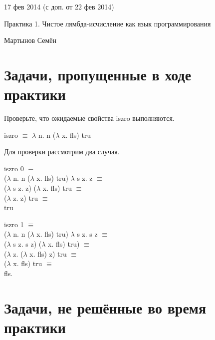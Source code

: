 \documentclass[a4paper,12pt]{article} %
\begin{document}
\begin{flushright}
{\color{red} 17 фев 2014 (с доп. от 22 фев 2014)}

Практика 1. Чистое лямбда-исчисление как язык программирования

Мартынов Семён

\hrulefill
\end{flushright}

\section{Задачи, пропущенные в ходе практики}

\begin{enumerate}
{\item Проверьте, что ожидаемые свойства iszro выполняются.}

iszro $\equiv$ $\lambda$ n. n ($\lambda$ x. fls) tru

  \begin{adjustwidth}{1em}{0pt}
  Для проверки рассмотрим два случая.
  
  iszro 0 $\equiv$ \\
  ($\lambda$ n. n ($\lambda$ x. fls) tru) $\lambda$ s z. z $\equiv$ \\
  ($\lambda$ s z. z) ($\lambda$ x. fls) tru $\equiv$ \\
  ($\lambda$ z. z) tru $\equiv$ \\
  tru
  
  iszro 1 $\equiv$ \\
  ($\lambda$ n. n ($\lambda$ x. fls) tru) $\lambda$ s z. s z $\equiv$ \\
  ($\lambda$ s z. s z) ($\lambda$ x. fls) tru) $\equiv$ \\
  ($\lambda$ z. ($\lambda$ x. fls) z) tru $\equiv$ \\
  ($\lambda$ x. fls) tru $\equiv$ \\
  fls.
  \end{adjustwidth}

\end{enumerate}

\section{Задачи, не решённые во время практики}
\end{document}
